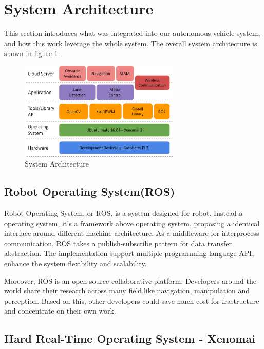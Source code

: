 \documentclass[conference]{IEEEtran}
\begin{document}
\section{System Architecture}

This section introduces what was integrated into our autonomous vehicle system, and how this work leverage the whole system. The overall system architecture is shown in figure \ref{fig:overall_arch}.

\begin{figure}
	\centering
	\includegraphics[width=3in]{img/arch.png}
	\caption{System Architecture}
	\label{fig:overall_arch}
\end{figure}

\subsection{Robot Operating System(ROS)}

Robot Operating System, or ROS, is a system designed for robot. Instead a operating system, it’s a framework above operating system, proposing a identical interface around different machine architecture. As a middleware for interprocess communication, ROS takes a publish-subscribe pattern for data transfer abstraction. The implementation support multiple programming language API, enhance the system flexibility and scalability.

Moreover, ROS is an open-source collaborative platform. Developers around the world share their research across many field,like navigation, manipulation and perception. Based on this, other developers could save much cost for frastructure and concentrate on their own work.

\subsection{Hard Real-Time Operating System - Xenomai}
\end{document}
